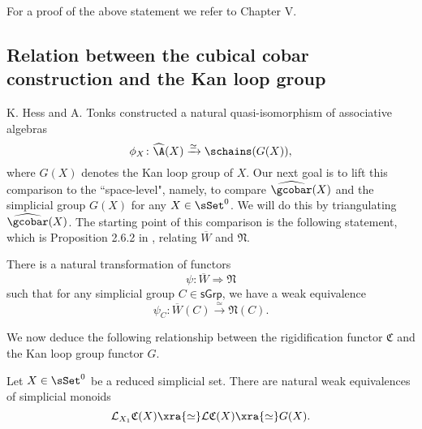 For a proof of the above statement we refer to \cite{goerss2009simplicial} Chapter V. 

\subsection{Relation between the cubical cobar construction and the Kan loop group}

K. Hess and A. Tonks constructed a natural quasi-isomorphism of associative algebras $$\phi_{X} \colon \widehat{\A}(X)\xrightarrow{\simeq} \schains(G(X)),$$ where $G(X)$ denotes the Kan loop group of $X$. Our next goal is to lift this comparison to the ``space-level", namely, to compare $\widehat{\gcobar}(X)$ and the simplicial group $G(X)$ for any $X \in \sSet^0$. We will do this by triangulating $\widehat{\gcobar}(X)$. The starting point of this comparison is the following statement, which is Proposition 2.6.2 in \cite{hinich2007deformation}, relating $\overline{W}$ and $\mathfrak{N}$.

\begin{proposition}\label{hinich}
There is a natural transformation of functors $$\psi: \overline{W} \Longrightarrow \mathfrak{N}$$ such that for any simplicial group $C \in \mathsf{sGrp}$, we have a weak equivalence
$$\psi_C: \overline{W}(C) \xrightarrow{\simeq} \mathfrak{N}(C).$$
\end{proposition} 

We now deduce the following relationship between the rigidification functor $\mathfrak{C}$ and the Kan loop group functor $G$.

\begin{proposition}\label{CandG} Let $X \in \sSet^0$ be a reduced simplicial set. There are natural weak equivalences of simplicial monoids
$$\mathcal{L}_{X_1} \mathfrak{C}(X) \xra{\simeq} \mathcal{L}\mathfrak{C}(X) \xra{\simeq} G(X).$$
\end{proposition}


